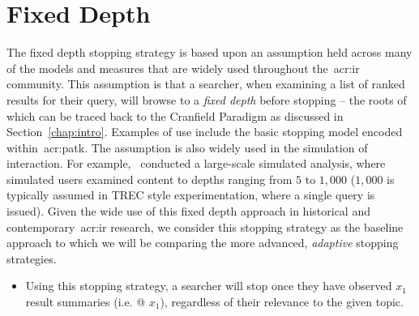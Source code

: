 \section{Fixed Depth}
The fixed depth stopping strategy is based upon an assumption held across many of the models and measures that are widely used throughout the~\gls{acr:ir} community. This assumption is that a searcher, when examining a list of ranked results for their query, will browse to a \emph{fixed depth} before stopping -- the roots of which can be traced back to the Cranfield Paradigm as discussed in Section~\ref{chap:intro}. Examples of use include the basic stopping model encoded within~\gls{acr:patk}. The assumption is also widely used in the simulation of interaction. For example,~\cite{azzopardi2011economics} conducted a large-scale simulated analysis, where simulated users examined content to depths ranging from $5$ to $1,000$ ($1,000$ is typically assumed in TREC style experimentation, where a single query is issued). Given the wide use of this fixed depth approach in historical and contemporary~\gls{acr:ir} research, we consider this stopping strategy as the baseline approach to which we will be comparing the more advanced, \emph{adaptive} stopping strategies.

\begin{itemize}
    
    \item[]{} Using this stopping strategy, a searcher will stop once they have observed $x_1$ result summaries (i.e.  @ $x_1$), regardless of their relevance to the given topic.
    
\end{itemize}

